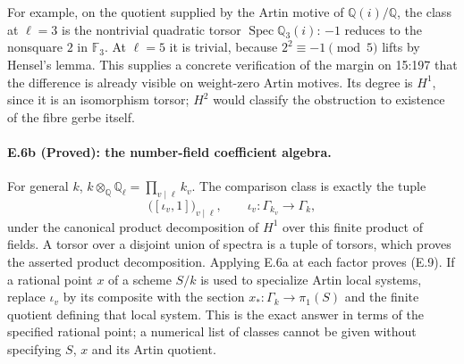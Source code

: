 For example, on the quotient supplied by the Artin motive of
$\mathbb Q(i)/\mathbb Q$, the class at $\ell=3$ is the nontrivial
quadratic torsor $\operatorname{Spec}\mathbb Q_3(i)$: $-1$ reduces to
the nonsquare $2$ in $\mathbb F_3$. At $\ell=5$ it is trivial, because
$2^2\equiv-1\pmod5$ lifts by Hensel's lemma. This supplies a concrete
verification of the margin on 15:197 that the difference is already
visible on weight-zero Artin motives. Its degree is $H^1$, since it is
an isomorphism torsor; $H^2$ would classify the obstruction to existence
of the fibre gerbe itself.

\paragraph{E.6b (Proved): the number-field coefficient algebra.}
For general $k$,
$k\otimes_{\mathbb Q}\mathbb Q_\ell=\prod_{v\mid\ell}k_v$.
The comparison class is exactly the tuple
\[
 \bigl([\iota_v,1]\bigr)_{v\mid\ell},\qquad
 \iota_v:\Gamma_{k_v}\longrightarrow\Gamma_k,
 \tag{E.9}
\]
under the canonical product decomposition of $H^1$ over this finite
product of fields. A torsor over a disjoint union of spectra is a tuple
of torsors, which proves the asserted product decomposition. Applying
E.6a at each factor proves (E.9). If a rational point $x$ of a scheme
$S/k$ is used to specialize Artin local systems, replace $\iota_v$ by
its composite with the section $x_*:\Gamma_k\to\pi_1(S)$ and the finite
quotient defining that local system. This is the exact answer in terms
of the specified rational point; a numerical list of classes cannot be
given without specifying $S$, $x$ and its Artin quotient.
